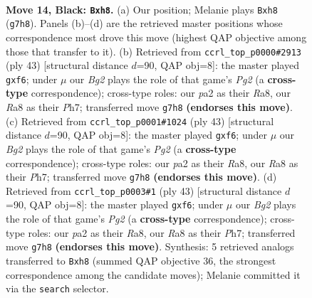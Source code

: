 \documentclass[11pt]{article}
\begin{document}
\clearpage

\begin{figure}[p]\centering
\begin{subfigure}{0.46\textwidth}\centering
\resizebox{\linewidth}{!}{%
\newchessgame
\chessboard[
  setfen={rnbqk2R/pp4b1/6p1/8/3pP1P1/8/P7/R1BQKBN1 b Qq - 0 14},
  showmover=false,
  pgfstyle=straightmove, color=movearrow, markmove={g7-h8}
]}
\caption{}
\end{subfigure}\hfill
\begin{subfigure}{0.46\textwidth}\centering
\resizebox{\linewidth}{!}{%
\newchessgame
\chessboard[
  setfen={r1bk4/6pp/pqp1pN2/4p2B/8/8/P1P1Q1PP/4KR2 b - - 0 22},
  showmover=false,
  pgfstyle=straightmove, color=movearrow, markmove={g7-f6}
]}
\caption{}
\end{subfigure}
\\[4pt]
\begin{subfigure}{0.46\textwidth}\centering
\resizebox{\linewidth}{!}{%
\newchessgame
\chessboard[
  setfen={r1bk4/6pp/pqp1pN2/4p2B/8/8/P1P1Q1PP/4KR2 b - - 0 22},
  showmover=false,
  pgfstyle=straightmove, color=movearrow, markmove={g7-f6}
]}
\caption{}
\end{subfigure}\hfill
\begin{subfigure}{0.46\textwidth}\centering
\resizebox{\linewidth}{!}{%
\newchessgame
\chessboard[
  setfen={r1bk4/6pp/pqp1pN2/4p2B/8/8/P1P1Q1PP/4KR2 b - - 0 22},
  showmover=false,
  pgfstyle=straightmove, color=movearrow, markmove={g7-f6}
]}
\caption{}
\end{subfigure}
\caption{\textbf{Move 14, Black: \texttt{Bxh8}.} (a) Our position; Melanie plays \texttt{Bxh8} (\texttt{g7h8}). Panels (b)--(d) are the retrieved master positions whose correspondence most drove this move (highest QAP objective among those that transfer to it). (b) Retrieved from \texttt{ccrl\_top\_p0000\#2913} (ply 43) [structural distance $d$=90, QAP obj=8]: the master played \texttt{gxf6}; under $\mu$ our \emph{Bg2} plays the role of that game's \emph{Pg2} (a \textbf{cross-type} correspondence); cross-type roles: our \emph{p}a2 as their \emph{R}a8, our \emph{R}a8 as their \emph{P}h7; transferred move \texttt{g7h8} \textbf{(endorses this move)}. (c) Retrieved from \texttt{ccrl\_top\_p0001\#1024} (ply 43) [structural distance $d$=90, QAP obj=8]: the master played \texttt{gxf6}; under $\mu$ our \emph{Bg2} plays the role of that game's \emph{Pg2} (a \textbf{cross-type} correspondence); cross-type roles: our \emph{p}a2 as their \emph{R}a8, our \emph{R}a8 as their \emph{P}h7; transferred move \texttt{g7h8} \textbf{(endorses this move)}. (d) Retrieved from \texttt{ccrl\_top\_p0003\#1} (ply 43) [structural distance $d$=90, QAP obj=8]: the master played \texttt{gxf6}; under $\mu$ our \emph{Bg2} plays the role of that game's \emph{Pg2} (a \textbf{cross-type} correspondence); cross-type roles: our \emph{p}a2 as their \emph{R}a8, our \emph{R}a8 as their \emph{P}h7; transferred move \texttt{g7h8} \textbf{(endorses this move)}. Synthesis: 5 retrieved analogs transferred to \texttt{Bxh8} (summed QAP objective 36, the strongest correspondence among the candidate moves); Melanie committed it via the \texttt{search} selector.}
\label{fig:thought-m27}
\end{figure}
\end{document}
